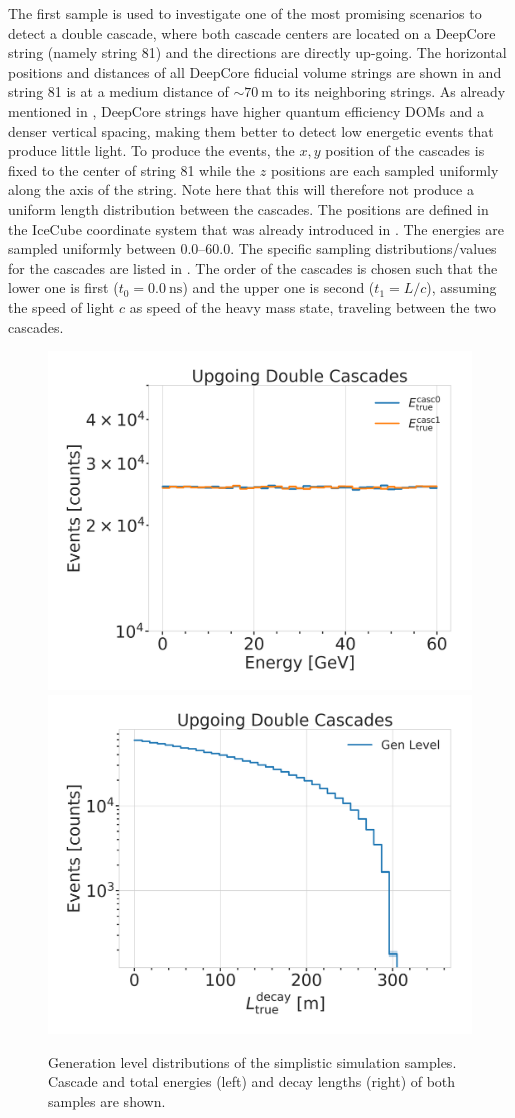 The first sample is used to investigate one of the most promising scenarios to detect a double cascade, where both cascade centers are located on a DeepCore string (namely string 81) and the directions are directly up-going. The horizontal positions and distances of all DeepCore fiducial volume strings are shown in  and string 81 is at a medium distance of $\sim\SI{70}{\metre}$ to its neighboring strings. As already mentioned in , DeepCore strings have higher quantum efficiency DOMs and a denser vertical spacing, making them better to detect low energetic events that produce little light. To produce the events, the $x,y$ position of the cascades is fixed to the center of string 81 while the $z$ positions are each sampled uniformly along the axis of the string. Note here that this will therefore not produce a uniform length distribution between the cascades. The positions are defined in the IceCube coordinate system that was already introduced in . The energies are sampled uniformly between \SIrange[range-phrase={~and~}]{0.0}{60.0}{\gev}. The specific sampling distributions/values for the cascades are listed in . The order of the cascades is chosen such that the lower one is first ($t_0=\SI{0.0}{\nano\second}$) and the upper one is second ($t_1=L/c$), assuming the speed of light $c$ as speed of the heavy mass state, traveling between the two cascades.

\begin{figure}[h]
    \centering
    \includegraphics[width=.49\linewidth]{figures/model_independent_simulation/gen_level/1_d_distr_energies_clipped.png}
    \includegraphics[width=.49\linewidth]{figures/model_independent_simulation/gen_level/1_d_distr_true_decay_length_clipped.png}
    \caption[Simplified model independent simulation generation level distributions]{Generation level distributions of the simplistic simulation samples. Cascade and total energies (left) and decay lengths (right) of both samples are shown.}
\end{figure}

